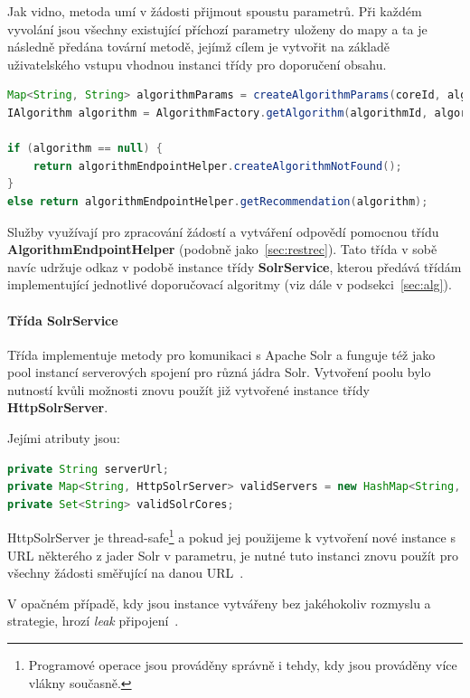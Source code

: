 \documentclass[thesis=M,czech]{FITthesis}[2014/05/07]
\begin{document}
Jak vidno, metoda umí v žádosti přijmout spoustu parametrů. Při každém vyvolání jsou všechny existující příchozí parametry uloženy do mapy a ta je následně předána tovární metodě, jejímž cílem je vytvořit na základě uživatelského vstupu vhodnou instanci třídy pro doporučení obsahu.

\begin{lstlisting}[language=java]
Map<String, String> algorithmParams = createAlgorithmParams(coreId, algorithmId, groupId, userId, documentId, text, limit);
IAlgorithm algorithm = AlgorithmFactory.getAlgorithm(algorithmId, algorithmParams);

if (algorithm == null) {
    return algorithmEndpointHelper.createAlgorithmNotFound();
}
else return algorithmEndpointHelper.getRecommendation(algorithm);
\end{lstlisting}

Služby využívají pro zpracování žádostí a vytváření odpovědí pomocnou třídu \textbf{AlgorithmEndpointHelper} (podobně jako~\ref{sec:restrec}). Tato třída v sobě navíc udržuje odkaz v podobě instance třídy \textbf{SolrService}, kterou předává třídám implementující jednotlivé doporučovací algoritmy (viz dále v podsekci~\ref{sec:alg}). 

\paragraph{Třída SolrService}
	
Třída implementuje metody pro komunikaci s Apache Solr a funguje též jako pool instancí serverových spojení pro různá jádra Solr. Vytvoření poolu bylo nutností kvůli možnosti znovu použít již vytvořené instance třídy \textbf{HttpSolrServer}.

Jejími atributy jsou:

\begin{lstlisting}[language=java]
private String serverUrl;
private Map<String, HttpSolrServer> validServers = new HashMap<String, HttpSolrServer>();
private Set<String> validSolrCores;
\end{lstlisting}

HttpSolrServer je thread-safe\footnote{Programové operace jsou prováděny správně i tehdy, kdy jsou prováděny více vlákny současně.} a pokud jej použijeme k vytvoření nové instance s URL některého z jader Solr v parametru, je nutné tuto instanci znovu použít pro všechny žádosti směřující na danou URL~\cite{solrj}. 

V opačném případě, kdy jsou instance vytvářeny bez jakéhokoliv rozmyslu a strategie, hrozí \emph{leak} připojení~\cite{metawerx}.
\end{document}
